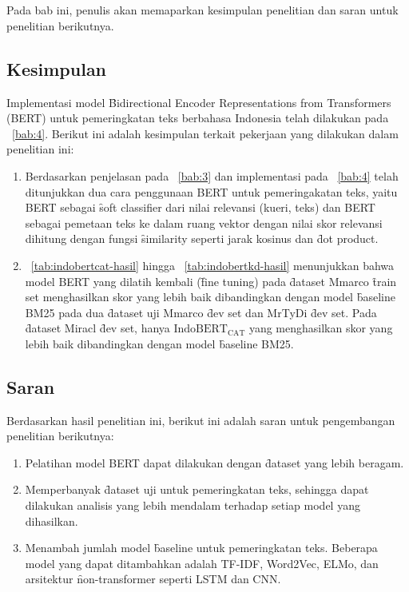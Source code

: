 \chapter{\kesimpulan}
\label{bab:6}
Pada bab ini, penulis akan memaparkan kesimpulan penelitian dan saran untuk penelitian berikutnya.


\section{Kesimpulan}
\label{sec:kesimpulan}
Implementasi model \f{Bidirectional Encoder Representations from Transformers} (BERT) untuk pemeringkatan teks berbahasa Indonesia telah dilakukan pada \sect~\ref{bab:4}. Berikut ini adalah kesimpulan terkait pekerjaan yang dilakukan dalam penelitian ini:

\begin{enumerate}
	\item  Berdasarkan penjelasan pada \sect~\ref{bab:3} dan implementasi pada \sect~\ref{bab:4} telah ditunjukkan dua cara penggunaan BERT untuk pemeringakatan teks, yaitu BERT sebagai \f{soft classifier} dari nilai relevansi (kueri, teks) dan BERT sebagai pemetaan teks ke dalam ruang vektor dengan nilai skor relevansi dihitung dengan fungsi \f{similarity} seperti jarak kosinus dan \f{dot product}.
	\item \tab~\ref{tab:indobertcat-hasil} hingga \tab~\ref{tab:indobertkd-hasil} menunjukkan bahwa model BERT yang dilatih kembali (\f{fine tuning}) pada \f{dataset} Mmarco \f{train set} menghasilkan skor yang lebih baik dibandingkan dengan model \f{baseline} BM25 pada dua \f{dataset} uji Mmarco \f{dev set} dan MrTyDi \f{dev set}. Pada \f{dataset} Miracl \f{dev set}, hanya $\text{IndoBERT}_{\text{CAT}}$ yang menghasilkan skor yang lebih baik dibandingkan dengan model \f{baseline} BM25.
\end{enumerate}

\section{Saran}
\label{sec:saran}
Berdasarkan hasil penelitian ini, berikut ini adalah saran untuk pengembangan penelitian berikutnya:
\begin{enumerate}
	\item Pelatihan model BERT dapat dilakukan dengan \f{dataset} yang lebih beragam. 
	\item Memperbanyak \f{dataset} uji untuk pemeringkatan teks, sehingga dapat dilakukan analisis yang lebih mendalam terhadap setiap model yang dihasilkan.
	\item Menambah jumlah model \f{baseline} untuk pemeringkatan teks. Beberapa model yang dapat ditambahkan adalah TF-IDF, Word2Vec, ELMo, dan arsitektur \f{non-transformer} seperti LSTM dan CNN.
\end{enumerate}
